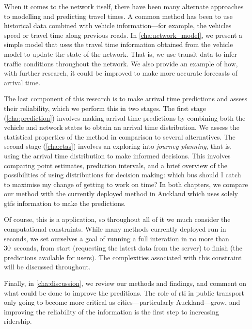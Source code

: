 When it comes to the network itself, there have been many alternate approaches to modelling and predicting travel times. A common method has been to use historical data combined with \rt{} vehicle information---for example, the vehicles speed or travel time along previous roads. In \cref{cha:network_model}, we present a simple \rt{} model that uses the \rt{} travel time information obtained from the vehicle model to update the state of the network. That is, we use \rt{} transit data to infer \rt{} traffic conditions throughout the network. We also provide an example of how, with further research, it could be improved to make more accurate forecasts of arrival time.


The last component of this research is to make arrival time predictions and assess their reliability, which we perform this in two stages. The first stage (\cref{cha:prediction}) involves making arrival time predictions by combining both the vehicle and network states to obtain an arrival time distribution. We assess the statistical properties of the method in comparison to several alternatives. The second stage (\cref{cha:etas}) involves an exploring into \emph{journey planning}, that is, using the arrival time distribution to make informed decisions. This involves comparing point estimates, prediction intervals, and a brief overview of the possibilities of using distributions for decision making: which bus should I catch to maximise my change of getting to work on time? In both chapters, we compare our method with the currently deployed method in Auckland which uses solely \gls{gtfs} information to make the predictions.


Of course, this is a \rt{} application, so throughout all of it we much consider the computational constraints. While many methods currently deployed run in seconds, we set ourselves a goal of running a full interation in no more than 30~seconds, from start (requesting the latest data from the server) to finish (the predictions available for users). The complexities associated with this constraint will be discussed throughout.


Finally, in \cref{cha:discussion}, we review our methods and findings, and comment on what could be done to improve the preditions. The role of \gls{rti} in public transport only going to become more critical as cities---particularly Auckland---grow, and improving the reliability of the information is the first step to increasing ridership.
